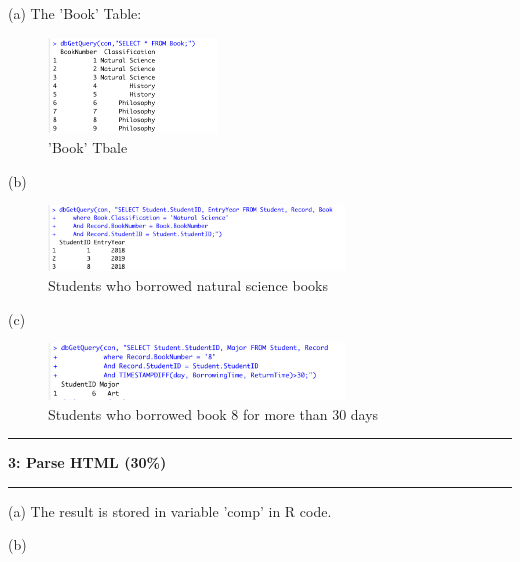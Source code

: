 \documentclass[11pt]{article}
\newcommand\question[2]{\vspace{.25in}\hrule\textbf{#1: #2}\vspace{.5em}\hrule\vspace{.10in}}
\begin{document}
(a) The 'Book' Table:
\begin{figure}[H]
    \centering
    \includegraphics[width=0.4\textwidth]{figures/Q2.1.png}
    \caption{'Book' Tbale}
\end{figure}
(b) 
\begin{figure}[H]
    \centering
    \includegraphics[width=0.7\textwidth]{figures/Q2.2.png}
    \caption{Students who borrowed natural science books}
\end{figure}
(c)
\begin{figure}[H]
    \centering
    \includegraphics[width=0.7\textwidth]{figures/Q2.3.png}
    \caption{Students who borrowed book 8 for more than 30 days}
\end{figure}

\question{3}{Parse HTML (30\%)}
(a) The result is stored in variable 'comp' in R code.

(b) 
\end{document}
